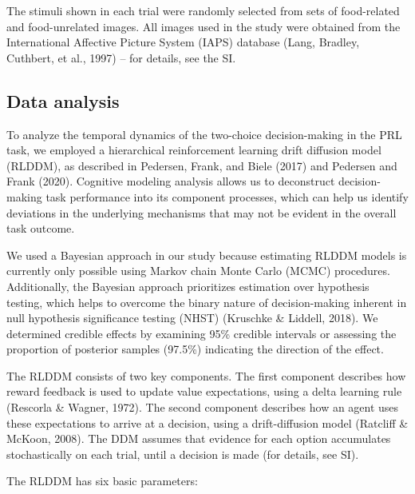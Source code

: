 \documentclass[
  man,floatsintext]{apa6}
\begin{document}
The stimuli shown in each trial were randomly selected from sets of food-related and food-unrelated images. All images used in the study were obtained from the International Affective Picture System (IAPS) database (Lang, Bradley, Cuthbert, et al., 1997) -- for details, see the SI.

\hypertarget{data-analysis}{%
\subsection{Data analysis}\label{data-analysis}}

To analyze the temporal dynamics of the two-choice decision-making in the PRL task, we employed a hierarchical reinforcement learning drift diffusion model (RLDDM), as described in Pedersen, Frank, and Biele (2017) and Pedersen and Frank (2020). Cognitive modeling analysis allows us to deconstruct decision-making task performance into its component processes, which can help us identify deviations in the underlying mechanisms that may not be evident in the overall task outcome.

We used a Bayesian approach in our study because estimating RLDDM models is currently only possible using Markov chain Monte Carlo (MCMC) procedures. Additionally, the Bayesian approach prioritizes estimation over hypothesis testing, which helps to overcome the binary nature of decision-making inherent in null hypothesis significance testing (NHST) (Kruschke \& Liddell, 2018). We determined credible effects by examining 95\% credible intervals or assessing the proportion of posterior samples (97.5\%) indicating the direction of the effect.

The RLDDM consists of two key components. The first component describes how reward feedback is used to update value expectations, using a delta learning rule (Rescorla \& Wagner, 1972). The second component describes how an agent uses these expectations to arrive at a decision, using a drift-diffusion model (Ratcliff \& McKoon, 2008). The DDM assumes that evidence for each option accumulates stochastically on each trial, until a decision is made (for details, see SI).

The RLDDM has six basic parameters:
\end{document}
